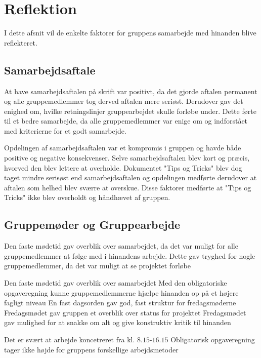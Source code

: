 \section{Reflektion}
I dette afsnit vil de enkelte faktorer for gruppens samarbejde med hinanden blive reflekteret.

\subsection{Samarbejdsaftale}
At have samarbejdsaftalen på skrift var positivt, da det gjorde aftalen permanent og alle gruppemedlemmer tog derved aftalen mere seriøst. Derudover gav det enighed om, hvilke retningslinjer gruppearbejdet skulle forløbe under. Dette førte til et bedre samarbejde, da alle gruppemedlemmer var enige om og indforstået med kriterierne for et godt samarbejde.

Opdelingen af samarbejdsaftalen var et kompromis i gruppen og havde både positive og negative konsekvenser. Selve samarbejdsaftalen blev kort og præcis, hvorved den blev lettere at overholde. Dokumentet "Tips og Tricks" blev dog taget mindre serisøst end samarbejdsaftalen og opdelingen medførte derudover at aftalen som helhed blev sværre at overskue. Disse faktorer medførte at "Tips og Tricks" ikke blev  overholdt og håndhævet af gruppen.

\subsection{Gruppemøder og Gruppearbejde}
Den faste mødetid gav overblik over samarbejdet, da det var muligt for alle gruppemedlemmer at følge med i hinandens arbejde. Dette gav tryghed for nogle gruppemedlemmer, da det var muligt at se projektet forløbe

Den faste mødetid gav overblik over samarbejdet                                                                                                       \newline
Med den obligatoriske opgaveregning kunne gruppemedlemmerne hjælpe hinanden op på et højere fagligt niveau                                            \newline
En fast dagsorden gav god, fast struktur for fredagsmøderne                                                                                           \newline
Fredagsmødet gav gruppen et overblik over status for projektet                                                                                        
Fredagsmødet gav mulighed for at snakke om alt og give konstruktiv kritik til hinanden

Det er svært at arbejde koncetreret fra kl. $8.15$-$16.15$                                     \newline
Obligatorisk opgaveregning tager ikke højde for gruppens forskellige arbejdsmetoder 